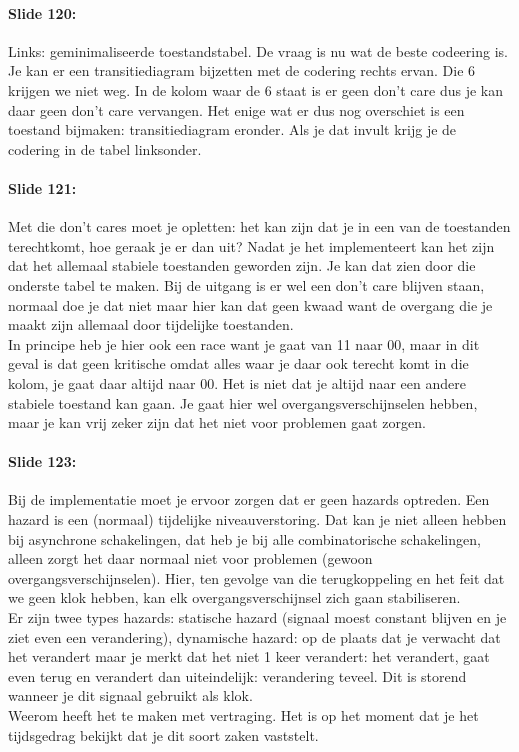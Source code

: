 \documentclass[10pt,a4paper]{book}
\begin{document}
\paragraph{Slide 120:} Links: geminimaliseerde toestandstabel. De vraag is nu wat de beste codeering is. Je kan er een transitiediagram bijzetten met de codering rechts ervan. Die 6 krijgen we niet weg. In de kolom waar de 6 staat is er geen don't care dus je kan daar geen don't care vervangen. Het enige wat er dus nog overschiet is een toestand bijmaken: transitiediagram eronder. Als je dat invult krijg je de codering in de tabel linksonder.

\paragraph{Slide 121:} Met die don't cares moet je opletten: het kan zijn dat je in een van de toestanden terechtkomt, hoe geraak je er dan uit? Nadat je het implementeert kan het zijn dat het allemaal stabiele toestanden geworden zijn.
Je kan dat zien door die onderste tabel te maken. Bij de uitgang is er wel een don't care blijven staan, normaal doe je dat niet maar hier kan dat geen kwaad want de overgang die je maakt zijn allemaal door tijdelijke toestanden.\\
In principe heb je hier ook een race want je gaat van 11 naar 00, maar in dit geval is dat geen kritische omdat alles waar je daar ook terecht komt in die kolom, je gaat daar altijd naar 00. Het is niet dat je altijd naar een andere stabiele toestand kan gaan. Je gaat hier wel overgangsverschijnselen hebben, maar je kan vrij zeker zijn dat het niet voor problemen gaat zorgen.

\paragraph{Slide 123:} Bij de implementatie moet je ervoor zorgen dat er geen hazards optreden. Een hazard is een (normaal) tijdelijke niveauverstoring. Dat kan je niet alleen hebben bij asynchrone schakelingen, dat heb je bij alle combinatorische schakelingen, alleen zorgt het daar normaal niet voor problemen (gewoon overgangsverschijnselen). Hier, ten gevolge van die terugkoppeling en het feit dat we geen klok hebben, kan elk overgangsverschijnsel zich gaan stabiliseren.\\
Er zijn twee types hazards: statische hazard (signaal moest constant blijven en je ziet even een verandering), dynamische hazard: op de plaats dat je verwacht dat het verandert maar je merkt dat het niet 1 keer verandert: het verandert, gaat even terug en verandert dan uiteindelijk: verandering teveel. Dit is storend wanneer je dit signaal gebruikt als klok.\\
Weerom heeft het te maken met vertraging. Het is op het moment dat je het tijdsgedrag bekijkt dat je dit soort zaken vaststelt.
\end{document}
